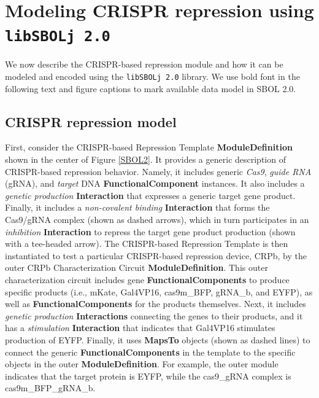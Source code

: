 \section*{Modeling CRISPR repression using {\tt libSBOLj 2.0}}
We now describe the CRISPR-based repression module and how it can be modeled and encoded using the {\tt libSBOLj 2.0} library. We use bold font in the following text and figure captions to mark available data model in SBOL 2.0. 

\subsection*{CRISPR repression model}
First, consider the CRISPR-based Repression Template \textbf{ModuleDefinition} shown in the center of Figure \ref{SBOL2}. It provides a generic description of CRISPR-based repression behavior. Namely, it includes generic \emph{Cas9}, \emph{guide RNA} (gRNA), and \emph{target} DNA \textbf{FunctionalComponent} instances. It also includes a \emph{genetic production} \textbf{Interaction} that expresses a generic target gene product.  Finally, it includes a \emph{non-covalent binding} \textbf{Interaction} that forms the Cas9/gRNA complex (shown as dashed arrows), which in turn participates in an \emph{inhibition} \textbf{Interaction} to repress the target gene product production (shown with a tee-headed arrow). The CRISPR-based Repression Template is then instantiated to test a particular CRISPR-based repression device, CRPb, by the outer CRPb Characterization Circuit \textbf{ModuleDefinition}.  This outer characterization circuit includes gene \textbf{FunctionalComponents} to produce specific products (i.e., mKate, Gal4VP16, cas9m\_BFP, gRNA\_b, and EYFP), as well as \textbf{FunctionalComponents} for the products themselves.  Next, it includes \emph{genetic production} \textbf{Interactions} connecting the genes to their products, and it has a \emph{stimulation} \textbf{Interaction} that indicates that Gal4VP16 stimulates production of EYFP.  Finally, it uses \textbf{MapsTo} objects (shown as dashed lines) to connect the generic \textbf{FunctionalComponents} in the template to the specific objects in the outer \textbf{ModuleDefinition}.  For example, the outer module indicates that the target protein is EYFP, while the cas9\_gRNA complex is cas9m\_BFP\_gRNA\_b.

